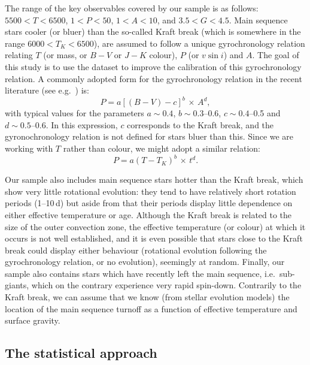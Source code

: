 \documentclass[11pt,a4paper]{article}
\begin{document}
The range of the key observables covered by our sample is as follows:
$5500 < T < 6500$, $1 <P < 50$, $1 < A < 10$, and $3.5 < G <
4.5$. Main sequence stars cooler (or bluer) than the so-called Kraft
break (which is somewhere in the range $6000 < T_K < 6500$), are
assumed to follow a unique gyrochronology relation relating $T$ (or
mass, or $B-V$ or $J-K$ colour), $P$ (or $v \sin i$) and $A$. The goal
of this study is to use the dataset to improve the calibration of this
gyrochronology relation.  A commonly adopted form for the
gyrochronology relation in the recent literature (see e.g.\
\citealt{bar07,mam+08}) is:
\begin{equation}
P = a \left[(B-V) - c\right]^b \, \times \, A^d,
\label{eq:gyro1}
\end{equation}
with typical values for the parameters $a \sim 0.4$, $b \sim
0.3$--0.6, $c \sim 0.4$--0.5 and $d \sim 0.5$--0.6. In this
expression, $c$ corresponds to the Kraft break, and the
gyronochronology relation is not defined for stars bluer than
this. Since we are working with $T$ rather than colour, we might adopt
a similar relation:
\begin{equation}
P = a (T - T_K)^b  \, \times \, t^d.
\label{eq:gyro2}
\end{equation}

Our sample also includes main sequence stars hotter than the Kraft
break, which show very little rotational evolution: they tend to have
relatively short rotation periods (1--10\,d) but aside from that their
periods display little dependence on either effective temperature or
age. Although the Kraft break is related to the size of the outer
convection zone, the effective temperature (or colour) at which it
occurs is not well established, and it is even possible that stars
close to the Kraft break could display either behaviour (rotational
evolution following the gyrochronology relation, or no evolution),
seemingly at random. Finally, our sample also contains stars which
have recently left the main sequence, i.e.\ sub-giants, which on the
contrary experience very rapid spin-down. Contrarily to the Kraft
break, we can assume that we know (from stellar evolution models) the
location of the main sequence turnoff as a function of effective
temperature and surface gravity.

\subsection{The statistical approach}
\end{document}
